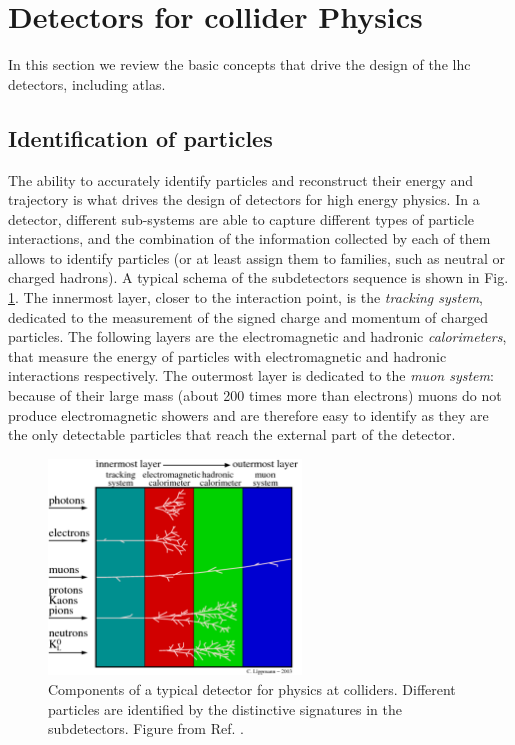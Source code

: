 \section{Detectors for collider Physics}
\label{sec:detectors}

In this section we review the basic concepts that drive the design of the \gls{lhc} detectors, including \gls{atlas}.

\subsection{Identification of particles}
\label{sec:detectors:identification}



The ability to accurately identify particles and reconstruct their energy and trajectory is what drives the design of detectors for high energy physics. In a detector, different sub-systems are able to capture different types of particle interactions, and the combination of the information collected by each of them allows to identify particles (or at least assign them to families, such as neutral or charged hadrons). A typical schema of the subdetectors sequence is shown in Fig. \ref{fig:detector:interaction}. The innermost layer, closer to the interaction point, is the \textit{tracking system}, dedicated to the measurement of the signed charge and momentum of charged particles. The following layers are the electromagnetic and hadronic \textit{calorimeters}, that measure the energy of particles with electromagnetic and hadronic interactions respectively. The outermost layer is dedicated to the \textit{muon system}: because of their large mass (about 200 times more than electrons) muons do not produce electromagnetic showers and are therefore easy to identify as they are the only detectable particles that reach the external part of the detector.

\begin{figure}[ht]
\centering
\includegraphics[width=0.6\textwidth]{figures/detector/particles_in_detector}
\caption{Components of a typical detector for physics at colliders. Different particles are identified by the distinctive signatures in the subdetectors. Figure from Ref. \cite{Lippmann:2011bb}.}
\label{fig:detector:interaction}
\end{figure}


